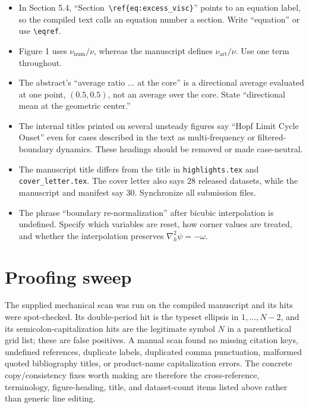 \documentclass[11pt]{article}
\begin{document}
\begin{itemize}
    \item In Section 5.4, ``Section~\texttt{\textbackslash ref\{eq:excess\_visc\}}'' points to an equation label, so the compiled text calls an equation number a section.  Write ``equation'' or use \texttt{\textbackslash eqref}.
    \item Figure 1 uses $\nu_{\mathrm{num}}/\nu$, whereas the manuscript defines $\nu_{\mathrm{art}}/\nu$.  Use one term throughout.
    \item The abstract's ``average ratio ... at the core'' is a directional average evaluated at one point, $(0.5,0.5)$, not an average over the core.  State ``directional mean at the geometric center.''
    \item The internal titles printed on several unsteady figures say ``Hopf Limit Cycle Onset'' even for cases described in the text as multi-frequency or filtered-boundary dynamics.  These headings should be removed or made case-neutral.
    \item The manuscript title differs from the title in \texttt{highlights.tex} and \texttt{cover\_letter.tex}.  The cover letter also says 28 released datasets, while the manuscript and manifest say 30.  Synchronize all submission files.
    \item The phrase ``boundary re-normalization'' after bicubic interpolation is undefined.  Specify which variables are reset, how corner values are treated, and whether the interpolation preserves $\nabla_h^2\psi=-\omega$.
\end{itemize}

\section*{Proofing sweep}

The supplied mechanical scan was run on the compiled manuscript and its hits were spot-checked.  Its double-period hit is the typeset ellipsis in $1,\ldots,N-2$, and its semicolon-capitalization hits are the legitimate symbol $N$ in a parenthetical grid list; these are false positives.  A manual scan found no missing citation keys, undefined references, duplicate labels, duplicated comma punctuation, malformed quoted bibliography titles, or product-name capitalization errors.  The concrete copy/consistency fixes worth making are therefore the cross-reference, terminology, figure-heading, title, and dataset-count items listed above rather than generic line editing.
\end{document}
